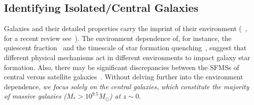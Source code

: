 \documentclass[preprint2,tighten]{aastex62}
\begin{document}

\subsection{Identifying Isolated/Central Galaxies} \label{sec:central}
Galaxies and their detailed properties carry the 
imprint of their environment (~\citealt{hubble1936, oemler1974, dressler1980, guzzo1997}, 
for a recent review see~\citealp{blanton2009}). The environment
dependence of, for instance, the quiescent 
fraction~\citep[\emph{e.g.}][]{baldry2006,peng2010,hahn2015}
and the timescale of star formation quenching~\citep{wetzel2013,hahn2017}, 
suggest that different physical mechanisms act in different environments 
to impact galaxy star formation. Also, there may be significant 
discrepancies between the SFMSs of central versus satellite 
galaxies~\citep{wang2018}. Without delving further into the 
environment dependence, \emph{we focus solely on the central galaxies, 
which constitute the majority of massive galaxies ($M_* > 10^{9.5}M_\odot$) 
at $z \sim 0$}. 
\end{document}
